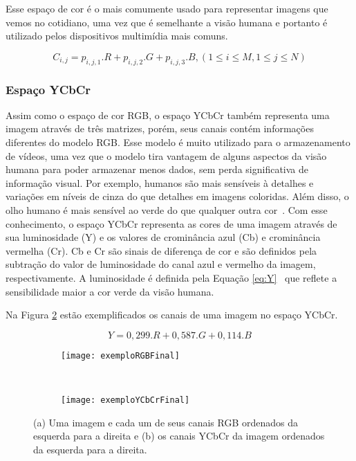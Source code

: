 Esse espaço de cor é o mais comumente usado para representar imagens que vemos no cotidiano, uma vez que é semelhante a visão humana e portanto é utilizado pelos dispositivos multimídia mais comuns.
	
	\begin{equation}
			C_{i,j} = p_{i,j,1} . R + p_{i,j,2} . G + p_{i,j,3} . B ,  (1\leq i\leq M, 1\leq j\leq N)
	\label{eq:corRGB}
	\end{equation}

\subsubsection{Espaço YCbCr}\label{sect:sub:ycbcr}

Assim como o espaço de cor RGB, o espaço YCbCr também representa uma imagem através de três matrizes, porém, seus canais contém informações diferentes do modelo RGB. Esse modelo é muito utilizado para o armazenamento de vídeos, uma vez que o modelo tira vantagem de alguns aspectos da visão humana para poder armazenar menos dados, sem perda significativa de informação visual. Por exemplo, humanos são mais sensíveis à detalhes e variações em níveis de cinza do que detalhes em imagens coloridas. Além disso, o olho humano é mais sensível ao verde do que qualquer outra cor~\cite{colorSpacesDigitalVideo}. Com esse conhecimento, o espaço YCbCr representa as cores de uma imagem através de sua luminosidade (Y) e os valores de crominância azul (Cb) e crominância vermelha (Cr). Cb e Cr são sinais de diferença de cor e são definidos pela subtração do valor de luminosidade do canal azul e vermelho da imagem, respectivamente. A luminosidade é definida pela Equação \ref{eq:Y}~\cite{LivroVideoDigital} que reflete a sensibilidade maior a cor verde da visão humana.

Na Figura \ref{fig:Espacos:sub:YCbCr} estão exemplificados os canais de uma imagem no espaço YCbCr.

\begin{equation}
	Y = 0,299.R + 0,587.G + 0,114.B
\label{eq:Y}
\end{equation}


\begin{figure}
 \centering
\begin{subfigure}{.5\textwidth}
  \centering
  \texttt{[image: exemploRGBFinal]}
	\caption{}
	\label{fig:Espacos:sub:RGB}
	\centering
\end{subfigure}\
\begin{subfigure}{.5\textwidth}
  \centering
  \texttt{[image: exemploYCbCrFinal]}
	\caption{}
	\label{fig:Espacos:sub:YCbCr}
	\centering
\end{subfigure}
\caption{(a) Uma imagem e cada um de seus canais RGB ordenados da esquerda para a direita e (b) os canais YCbCr da imagem ordenados da esquerda para a direita.}
\label{fig:Espacos}
\centering
\end{figure}

